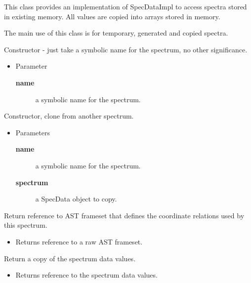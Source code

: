

{This class provides an implementation of SpecDataImpl to access
 spectra stored in existing memory. All values are copied into
 arrays stored in memory.
 
 The main use of this class is for temporary, generated and copied
 spectra.}
\constructors
{}
\begin{desc}Constructor - just take a symbolic name for the spectrum, no
 other significance.
\begin{itemize}
\item{Parameter
  \begin{description}
   \item[\textbf{name}]{a symbolic name for the spectrum.}
  \end{description}}
\end{itemize}
\end{desc}

\begin{desc}Constructor, clone from another spectrum.
\begin{itemize}
\item{Parameters
  \begin{description}
   \item[\textbf{name}]{a symbolic name for the spectrum.}
   \item[\textbf{spectrum}]{a SpecData object to copy.}
  \end{description}}
\end{itemize}
\end{desc}

\methods
{}
\begin{desc}Return reference to AST frameset that defines the coordinate
 relations used by this spectrum.
\begin{itemize}
\item{Returns reference to a raw AST frameset. }
\end{itemize}
\end{desc}

\begin{desc}Return a copy of the spectrum data values.
\begin{itemize}
\item{Returns reference to the spectrum data values. }
\end{itemize}
\end{desc}

